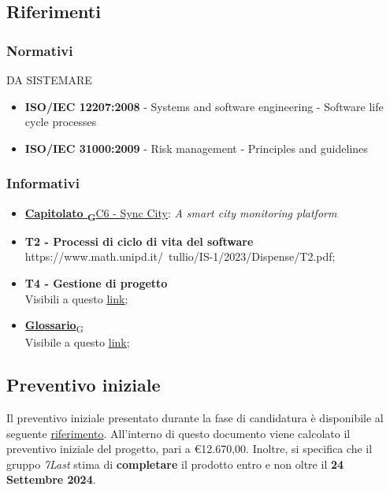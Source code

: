 \subsection{Riferimenti}
    \subsubsection{Normativi}DA SISTEMARE
        \begin{itemize}
            \item \textbf{ISO/IEC 12207:2008} - Systems and software engineering - Software life cycle processes
            \item \textbf{ISO/IEC 31000:2009} - Risk management - Principles and guidelines
        \end{itemize}
    \subsubsection{Informativi}
        \begin{itemize}
            \item \href{https://7last.github.io/docs/rtb/documentazione-interna/glossario#capitolato}{\textbf{Capitolato \textsubscript{G}}C6 - Sync City}: \textit{A smart city monitoring platform}
            \item \textbf{T2 - Processi di ciclo di vita del software}\\ https://www.math.unipd.it/~tullio/IS-1/2023/Dispense/T2.pdf;
            \item \textbf{T4 - Gestione di progetto}\\ Visibili a questo \uline{\href{https://www.math.unipd.it/~tullio/IS-1/2023/Dispense/T4.pdf}{link}};
            \item \href{https://7last.github.io/docs/rtb/documentazione-interna/glossario#glossario}{\textbf{Glossario}\textsubscript{G}}\\ Visibile a questo \uline{\href{https://7last.github.io/docs/rtb/documentazione-interna/glossario}{link}};
        \end{itemize}
\subsection{Preventivo iniziale}
Il preventivo iniziale presentato durante la fase di candidatura è disponibile al seguente \uline{\href{https://github.com/7Last/docs/blob/main/1_candidatura/preventivo_costi_assunzione_impegni_v2.0.pdf}{riferimento}}. All'interno di questo documento viene calcolato il preventivo iniziale del progetto, pari a €12.670,00. Inoltre, si specifica che il gruppo \textit{7Last} stima di \textbf{completare} il prodotto entro e non oltre il \textbf{24 Settembre 2024}.